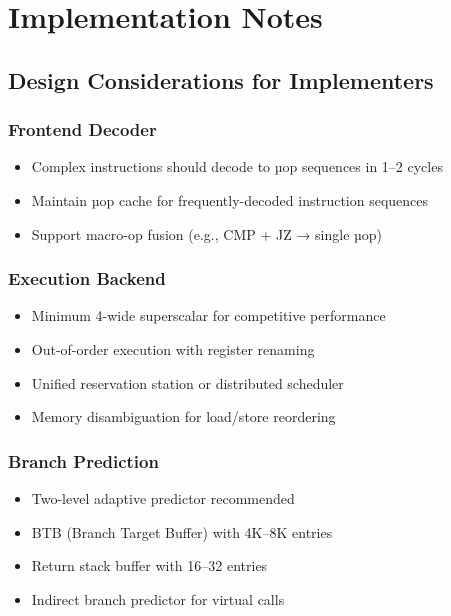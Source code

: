 \documentclass[12pt]{article}
\begin{document}
\section{Implementation Notes}

\subsection{Design Considerations for Implementers}

\subsubsection{Frontend Decoder}

\begin{itemize}
    \item Complex instructions should decode to µop sequences in 1--2 cycles
    \item Maintain µop cache for frequently-decoded instruction sequences
    \item Support macro-op fusion (e.g., CMP + JZ → single µop)
\end{itemize}

\subsubsection{Execution Backend}

\begin{itemize}
    \item Minimum 4-wide superscalar for competitive performance
    \item Out-of-order execution with register renaming
    \item Unified reservation station or distributed scheduler
    \item Memory disambiguation for load/store reordering
\end{itemize}

\subsubsection{Branch Prediction}

\begin{itemize}
    \item Two-level adaptive predictor recommended
    \item BTB (Branch Target Buffer) with 4K--8K entries
    \item Return stack buffer with 16--32 entries
    \item Indirect branch predictor for virtual calls
\end{itemize}
\end{document}
